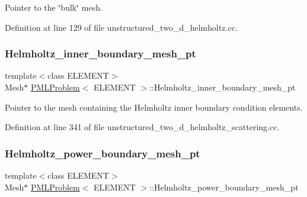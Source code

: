 Pointer to the \char`\"{}bulk\char`\"{} mesh. 



Definition at line 129 of file unstructured\+\_\+two\+\_\+d\+\_\+helmholtz.\+cc.

\mbox{\label{classPMLProblem_a7aeca36fdbe76a52bb68808f2d4547f2}} 
\subsubsection{\texorpdfstring{Helmholtz\+\_\+inner\+\_\+boundary\+\_\+mesh\+\_\+pt}{Helmholtz\_inner\_boundary\_mesh\_pt}}
{\footnotesize\ttfamily template$<$class E\+L\+E\+M\+E\+NT$>$ \\
Mesh$\ast$ \hyperlink{classPMLProblem}{P\+M\+L\+Problem}$<$ E\+L\+E\+M\+E\+NT $>$\+::Helmholtz\+\_\+inner\+\_\+boundary\+\_\+mesh\+\_\+pt\hspace{0.3cm}{\ttfamily [private]}}



Pointer to the mesh containing the Helmholtz inner boundary condition elements. 



Definition at line 341 of file unstructured\+\_\+two\+\_\+d\+\_\+helmholtz\+\_\+scattering.\+cc.

\mbox{\label{classPMLProblem_abf7ac369650cc7a876479a208752e02c}} 
\subsubsection{\texorpdfstring{Helmholtz\+\_\+power\+\_\+boundary\+\_\+mesh\+\_\+pt}{Helmholtz\_power\_boundary\_mesh\_pt}}
{\footnotesize\ttfamily template$<$class E\+L\+E\+M\+E\+NT$>$ \\
Mesh$\ast$ \hyperlink{classPMLProblem}{P\+M\+L\+Problem}$<$ E\+L\+E\+M\+E\+NT $>$\+::Helmholtz\+\_\+power\+\_\+boundary\+\_\+mesh\+\_\+pt\hspace{0.3cm}{\ttfamily [private]}}



